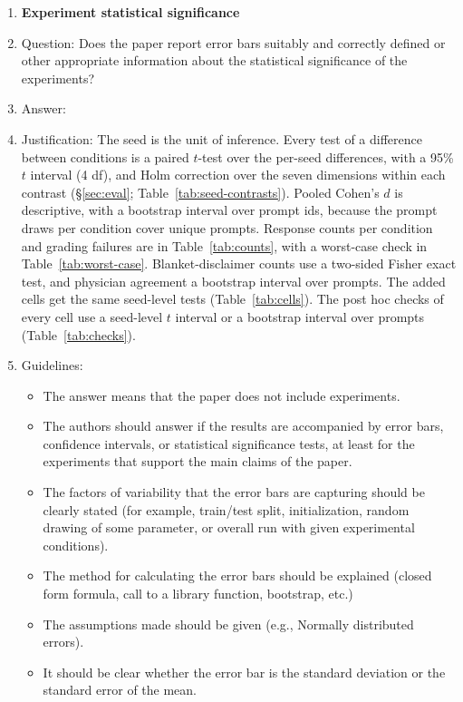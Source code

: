 \begin{enumerate}
\item {\bf Experiment statistical significance}
    \item[] Question: Does the paper report error bars suitably and correctly defined or other appropriate information about the statistical significance of the experiments?
    \item[] Answer: \answerYes{}
    \item[] Justification: The seed is the unit of inference. Every test of a difference between conditions is a paired $t$-test over the \statHBMedGemmaMaySeeds{} per-seed differences, with a 95\% $t$ interval (4 df), and Holm correction over the seven dimensions within each contrast (\S\ref{sec:eval}; Table~\ref{tab:seed-contrasts}). Pooled Cohen's $d$ is descriptive, with a bootstrap interval over prompt ids, because the \statHBMedGemmaMayPromptDraws{} prompt draws per condition cover \statHBMedGemmaMayPrompts{} unique prompts. Response counts per condition and grading failures are in Table~\ref{tab:counts}, with a worst-case check in Table~\ref{tab:worst-case}. Blanket-disclaimer counts use a two-sided Fisher exact test, and physician agreement a bootstrap interval over prompts. The added cells get the same seed-level tests (Table~\ref{tab:cells}). The post hoc checks of every cell use a seed-level $t$ interval or a bootstrap interval over prompts (Table~\ref{tab:checks}).
    \item[] Guidelines:
    \begin{itemize}
        \item The answer \answerNA{} means that the paper does not include experiments.
        \item The authors should answer \answerYes{} if the results are accompanied by error bars, confidence intervals, or statistical significance tests, at least for the experiments that support the main claims of the paper.
        \item The factors of variability that the error bars are capturing should be clearly stated (for example, train/test split, initialization, random drawing of some parameter, or overall run with given experimental conditions).
        \item The method for calculating the error bars should be explained (closed form formula, call to a library function, bootstrap, etc.)
        \item The assumptions made should be given (e.g., Normally distributed errors).
        \item It should be clear whether the error bar is the standard deviation or the standard error of the mean.

\end{itemize}
\end{enumerate}
